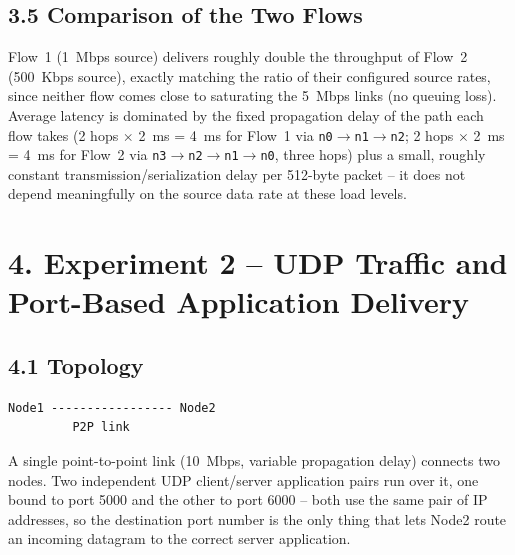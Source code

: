 \documentclass[11pt]{article}
\begin{document}
\subsection*{3.5 Comparison of the Two Flows}
Flow~1 (1~Mbps source) delivers roughly double the throughput of Flow~2
(500~Kbps source), exactly matching the ratio of their configured source
rates, since neither flow comes close to saturating the 5~Mbps links (no
queuing loss). Average latency is dominated by the fixed propagation delay
of the path each flow takes (2 hops $\times$ 2~ms = 4~ms for Flow~1 via
\texttt{n0}$\to$\texttt{n1}$\to$\texttt{n2}; 2 hops $\times$ 2~ms = 4~ms for
Flow~2 via \texttt{n3}$\to$\texttt{n2}$\to$\texttt{n1}$\to$\texttt{n0}, three
hops) plus a small, roughly constant transmission/serialization delay per
512-byte packet -- it does not depend meaningfully on the source data rate at
these load levels.

\section*{4. Experiment 2 -- UDP Traffic and Port-Based Application Delivery}

\subsection*{4.1 Topology}
\begin{center}
\begin{verbatim}
Node1 ----------------- Node2
         P2P link
\end{verbatim}
\end{center}
A single point-to-point link (10~Mbps, variable propagation delay) connects
two nodes. Two independent UDP client/server application pairs run over it,
one bound to port 5000 and the other to port 6000 -- both use the same pair
of IP addresses, so the destination port number is the only thing that lets
Node2 route an incoming datagram to the correct server application.
\end{document}
